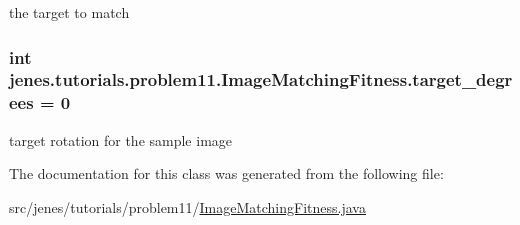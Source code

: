 the target to match \hypertarget{classjenes_1_1tutorials_1_1problem11_1_1_image_matching_fitness_abcf68166173033e945f0ed4c42520a84}{
\subsubsection[{target\-\_\-degrees}]{\setlength{\rightskip}{0pt plus 5cm}int jenes.\-tutorials.\-problem11.\-Image\-Matching\-Fitness.\-target\-\_\-degrees = 0\hspace{0.3cm}{\ttfamily [private]}}}\label{classjenes_1_1tutorials_1_1problem11_1_1_image_matching_fitness_abcf68166173033e945f0ed4c42520a84}
target rotation for the sample image 

The documentation for this class was generated from the following file\-:\begin{DoxyCompactItemize}
\item 
src/jenes/tutorials/problem11/\hyperlink{_image_matching_fitness_8java}{Image\-Matching\-Fitness.\-java}\end{DoxyCompactItemize}
